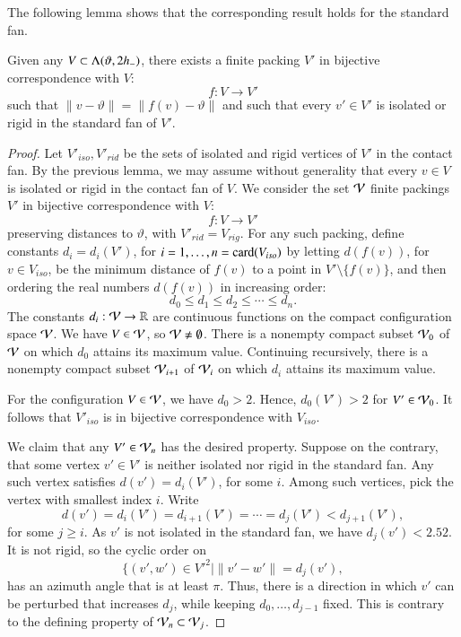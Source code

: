 The following lemma shows that the corresponding result
holds for the standard fan.

\begin{lemma}\label{lemma:rigid}  
Given any $V\subset \Lambda(\vartheta,2{h_-})$,
there exists a finite packing $V'$ 
in bijective correspondence with $V$:
$$
f:V\to V'
$$
such that $\|v-\vartheta\| = \|f(v)-\vartheta\|$ and
such that every $v'\in V'$
is isolated or rigid in the standard fan of $V'$.
\end{lemma}

\begin{proof}  
Let $V'_{iso},V'_{rid}$ be the
sets of isolated and rigid vertices of $V'$ in the contact
fan.
By the previous lemma, we may assume
without generality that every $v\in V$ is isolated
or rigid in the contact fan of $V$.    
We consider the set ${\mathcal V}$ finite
packings $V'$ in bijective correspondence with $V$:
$$
f:V\to V'
$$
preserving distances to $\vartheta$, with $V'_{rid}=V_{rig}$.
For any such packing, define constants $d_i=d_i(V')$,
for $i=1,\ldots,n={\operatorname{card}}(V_{iso})$ by letting 
$d(f(v))$, for $v\in V_{iso}$, 
be the minimum distance of $f(v)$ to a point
in $V'\setminus \{f(v)\}$, and then ordering the real numbers $d(f(v))$ in increasing order:
$$
d_0 \le d_1 \le d_2 \le \cdots \le d_n.
$$
The constants $d_i:{\mathcal V}\to\mathbb{R}$ are continuous functions on the compact configuration space ${\mathcal V}$.
We have $V\in {\mathcal V}$, so ${\mathcal V}\ne\emptyset$.
There is a nonempty 
compact subset ${\mathcal V}_0$ of ${\mathcal V}$ on which
$d_0$ attains its maximum value. Continuing recursively,
there is a nonempty compact subset ${\mathcal V}_{i+1}$ of
${\mathcal V}_{i}$ on which $d_i$ attains its maximum value.

For the configuration $V\in {\mathcal V}$, we have $d_0 >2$.
Hence, $d_0(V')>2$ for $V'\in{\mathcal V}_0$.  It follows
that $V'_{iso}$ is in bijective correspondence with
$V_{iso}$.

We claim that any $V'\in {\mathcal V}_n$ has the desired property.
Suppose on the contrary, that some vertex $v'\in V'$
is neither isolated nor rigid in the standard fan.  
Any such vertex satisfies $d(v')=d_i(V')$, for some $i$.
Among such vertices, pick the vertex with smallest index
$i$.  Write 
$$
d(v') = d_i(V') = d_{i+1}(V') =\cdots= d_j(V') < d_{j+1}(V'),
$$
for some $j\ge i$.  As $v'$ is not isolated in the
standard fan, we have $d_j(v') < 2.52$.  It is not rigid,
so the cyclic order on
$$
\{(v',w')\in V'^2 \mid \|v'-w'\| = d_j(v'),
$$
has an azimuth angle that is at least $\pi$.
Thus, there is a direction in which $v'$ can be perturbed
that increases $d_j$, while keeping $d_0,\ldots,d_{j-1}$
fixed.  This is contrary to the defining property of
${\mathcal V}_n\subset{\mathcal V}_j$.
\end{proof}


